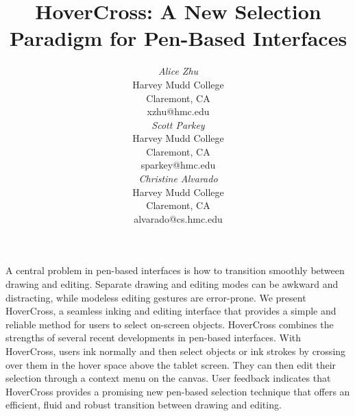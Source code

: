 \documentclass{article}
\begin{document}

\toappear{}



\title{HoverCross: A New Selection Paradigm for Pen-Based Interfaces}


\author{
\parbox[t]{5cm}{\centering
	     {\em Alice Zhu}\\
	     Harvey Mudd College\\
             Claremont, CA\\
	     xzhu@hmc.edu}
\parbox[t]{5cm}{\centering
	     {\em Scott Parkey}\\
	     Harvey Mudd College\\
	     Claremont, CA\\
	     sparkey@hmc.edu}
\parbox[t]{5cm}{\centering
	     {\em Christine Alvarado}\\
	     Harvey Mudd College\\
	     Claremont, CA\\
	     alvarado@cs.hmc.edu}
}

\maketitle

\abstract A central problem in pen-based interfaces is how to
transition smoothly between drawing and editing.  Separate drawing and
editing modes can be awkward and distracting, while modeless editing
gestures are error-prone.  We present HoverCross, a seamless inking and
editing interface that provides a simple and reliable method for users
to select on-screen objects.  HoverCross
combines the strengths of several recent developments in pen-based
interfaces.  With HoverCross, users ink normally and then select
objects or ink strokes by crossing over them in the hover space above
the tablet screen.  They can then edit their selection through a
context menu on the canvas.  User feedback indicates
that HoverCross provides a promising new pen-based selection technique that offers an efficient, fluid and robust transition
between drawing and editing.
\end{document}
